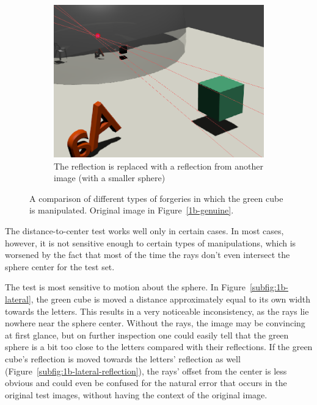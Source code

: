 \documentclass{thesis}
\begin{document}
\begin{figure}
    \begin{subfigure}{0.5\textwidth}
                \includegraphics[width=\textwidth]{1b-composite}
                \caption{The reflection is replaced with a reflection from another image (with a smaller sphere)}
                \label{subfig:1b-composite}
    \end{subfigure}
    \caption{A comparison of different types of forgeries in which the green cube is manipulated. Original image in Figure~\ref{1b-genuine}.}
	\label{forgery-comparison}
\end{figure}

The distance-to-center test works well only in certain cases. In most cases, however, it is not sensitive enough to certain types of manipulations, which is worsened by the fact that most of the time the rays don't even intersect the sphere center for the test set.

The test is most sensitive to motion about the sphere. In Figure~\ref{subfig:1b-lateral}, the green cube is moved a distance approximately equal to its own width towards the letters. This results in a very noticeable inconsistency, as the rays lie nowhere near the sphere center. Without the rays, the image may be convincing at first glance, but on further inspection one could easily tell that the green sphere is a bit too close to the letters compared with their reflections. If the green cube's reflection is moved towards the letters' reflection as well (Figure~\ref{subfig:1b-lateral-reflection}), the rays' offset from the center is less obvious and could even be confused for the natural error that occurs in the original test images, without having the context of the original image.
\end{document}
